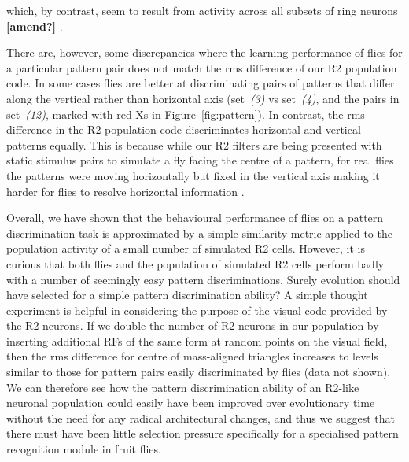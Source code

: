 which, by contrast, seem to result from activity across all subsets of ring neurons {\bf [amend?]} \cite{Solanki2015}.

There are, however, some discrepancies where the learning performance of flies for a particular pattern pair does not match the \ac{rms} difference of our R2 population code. In some cases flies are better at discriminating pairs of patterns that differ along the vertical rather than horizontal axis (set~\emph{(3)} vs set~\emph{(4)}, and the pairs in set~\emph{(12)}, marked with red Xs in Figure~\ref{fig:pattern}). In contrast, the \ac{rms} difference in the R2 population code discriminates horizontal and vertical patterns equally. This is because while our R2 filters are being presented with static stimulus pairs to simulate a fly facing the centre of a pattern, for real flies the patterns were moving horizontally but fixed in the vertical axis making it harder for flies to resolve horizontal information \cite{Ernst1999}.

Overall, we have shown that the behavioural performance of flies on a pattern discrimination task is approximated by a simple similarity metric applied to the population activity of a small number of simulated R2 cells. However, it is curious that both flies and the population of simulated R2 cells perform badly with a number of seemingly easy pattern discriminations. Surely evolution should have selected for a simple pattern discrimination ability? A simple thought experiment is helpful in considering the purpose of the visual code provided by the R2 neurons. If we double the number of R2 neurons in our population by inserting additional RFs of the same form at random points on the visual field, then the \ac{rms} difference for centre of mass-aligned triangles increases to levels similar to those for pattern pairs easily discriminated by flies (data not shown). We can therefore see how the pattern discrimination ability of an R2-like neuronal population could easily have been improved over evolutionary time without the need for any radical architectural changes, and thus we suggest that there must have been little selection pressure specifically for a specialised pattern recognition module in fruit flies.

\begin{comment}
Sig:
above: 8; below: 0; eq: 0; not given: 0; tot: 8
------
NS:
above: 5; below: 13; eq: 0; not given: 1; tot: 19
------
Sig not given:
above: 3; eq: 3; below: 0; not given: 3; tot: 9
------
tot tot: 36
\end{comment}


